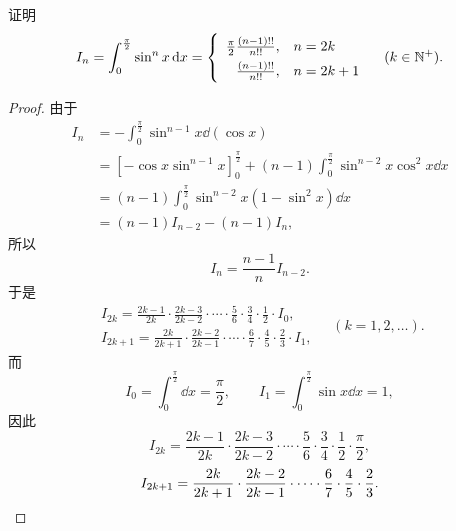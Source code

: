 \begin{example}\label{example:定积分.点火公式}
证明\begin{equation}\label{equation:定积分.点火公式}
\def\arraystretch{1.5}
I_n = \int_0^{\frac{\pi}{2}} \sin^n x \dd{x}
= \left\{ \begin{array}{rl}
\frac{\pi}{2}\frac{(n-1)!!}{n!!}, & n = 2k \\
\frac{(n-1)!!}{n!!}, & n = 2k+1
\end{array} \right.
\quad (k \in \mathbb{N}^+).
\end{equation}
\begin{proof}
由于\[
\begin{split}
I_n &= -\int_0^{\frac{\pi}{2}} \sin^{n-1} x \dd(\cos x) \\
&= [-\cos x \sin^{n-1} x]_0^{\frac\pi2}
	+ (n-1) \int_0^{\frac\pi2} \sin^{n-2} x \cos^2 x \dd{x} \\
&= (n-1) \int_0^{\frac\pi2} \sin^{n-2} x (1-\sin^2 x) \dd{x} \\
&= (n-1) I_{n-2} - (n-1) I_n,
\end{split}
\]所以\[
I_n = \frac{n-1}{n} I_{n-2}.
\]于是\[
\begin{split}
I_{2k} = \frac{2k-1}{2k} \cdot \frac{2k-3}{2k-2} \cdot \dotsm \cdot \frac{5}{6} \cdot \frac{3}{4} \cdot \frac{1}{2} \cdot I_0, \\
I_{2k+1} = \frac{2k}{2k+1} \cdot \frac{2k-2}{2k-1} \cdot \dotsm \cdot \frac{6}{7} \cdot \frac{4}{5} \cdot \frac{2}{3} \cdot I_1,
\end{split}
\quad(k=1,2,\dotsc).
\]而\[
I_0 = \int_0^{\frac{\pi}{2}} \dd{x} = \frac{\pi}{2},
\qquad
I_1 = \int_0^{\frac{\pi}{2}} \sin x \dd{x} = 1,
\]因此\[
I_{2k} = \frac{2k-1}{2k} \cdot \frac{2k-3}{2k-2} \cdot \dotsm \cdot \frac{5}{6} \cdot \frac{3}{4} \cdot \frac{1}{2} \cdot \frac{\pi}{2},
\]\[
I_{2k+1} = \frac{2k}{2k+1} \cdot \frac{2k-2}{2k-1} \cdot \dotsm \cdot \frac{6}{7} \cdot \frac{4}{5} \cdot \frac{2}{3}.
\qedhere
\]
\end{proof}
\end{example}

